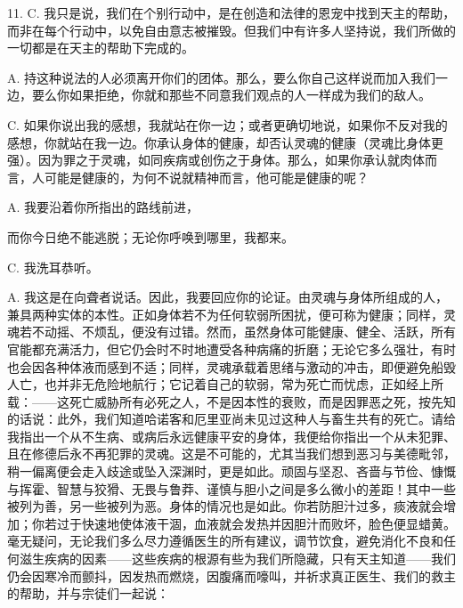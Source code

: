 11. C. 我只是说，我们在个别行动中，是在创造和法律的恩宠中找到天主的帮助，而非在每个行动中，以免自由意志被摧毁。但我们中有许多人坚持说，我们所做的一切都是在天主的帮助下完成的。\par

A. 持这种说法的人必须离开你们的团体。那么，要么你自己这样说而加入我们一边，要么你如果拒绝，你就和那些不同意我们观点的人一样成为我们的敌人。\par

C. 如果你说出我的感想，我就站在你一边；或者更确切地说，如果你不反对我的感想，你就站在我一边。你承认身体的健康，却否认灵魂的健康（灵魂比身体更强）。因为罪之于灵魂，如同疾病或创伤之于身体。那么，如果你承认就肉体而言，人可能是健康的，为何不说就精神而言，他可能是健康的呢？\par

A. 我要沿着你所指出的路线前进，\par

而你今日\newline{}绝不能逃脱；无论你呼唤到哪里，我都来。\par

C. 我洗耳恭听。\par

A. 我这是在向聋者说话。因此，我要回应你的论证。由灵魂与身体所组成的人，兼具两种实体的本性。正如身体若不为任何软弱所困扰，便可称为健康；同样，灵魂若不动摇、不烦乱，便没有过错。然而，虽然身体可能健康、健全、活跃，所有官能都充满活力，但它仍会时不时地遭受各种病痛的折磨；无论它多么强壮，有时也会因各种体液而感到不适；同样，灵魂承载着思绪与激动的冲击，即便避免船毁人亡，也并非无危险地航行；它记着自己的软弱，常为死亡而忧虑，正如经上所载：——这死亡威胁所有必死之人，不是因本性的衰败，而是因罪恶之死，按先知的话说：此外，我们知道哈诺客和厄里亚尚未见过这种人与畜生共有的死亡。请给我指出一个从不生病、或病后永远健康平安的身体，我便给你指出一个从未犯罪、且在修德后永不再犯罪的灵魂。这是不可能的，尤其当我们想到恶习与美德毗邻，稍一偏离便会走入歧途或坠入深渊时，更是如此。顽固与坚忍、吝啬与节俭、慷慨与挥霍、智慧与狡猾、无畏与鲁莽、谨慎与胆小之间是多么微小的差距！其中一些被列为善，另一些被列为恶。身体的情况也是如此。你若防胆汁过多，痰液就会增加；你若过于快速地使体液干涸，血液就会发热并因胆汁而败坏，脸色便显蜡黄。毫无疑问，无论我们多么尽力遵循医生的所有建议，调节饮食，避免消化不良和任何滋生疾病的因素——这些疾病的根源有些为我们所隐藏，只有天主知道——我们仍会因寒冷而颤抖，因发热而燃烧，因腹痛而嚎叫，并祈求真正医生、我们的救主的帮助，并与宗徒们一起说：\par

